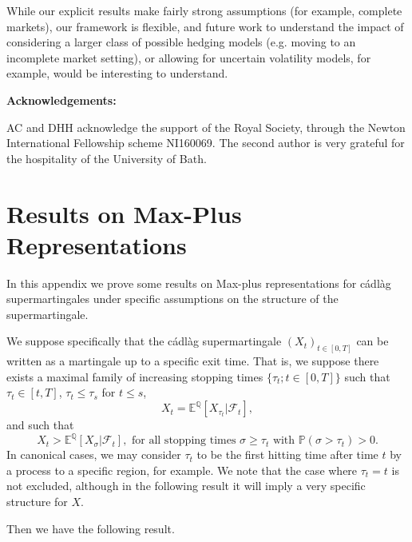 \documentclass[a4paper]{amsart}
\theoremstyle{definition}
\theoremstyle{remark}
\numberwithin{equation}{section}
\newcommand{\E}{\mathbb{E}}
\renewcommand{\P}{\mathbb{P}}
\newcommand{\Q}{\mathbb{Q}}
\newcommand{\Fc}{\mathcal{F}}
\newcommand{\Eq}[1]{\E^{\Q}\left[#1\right]}
\begin{document}
While our explicit results make fairly strong assumptions (for example, complete markets), our framework is flexible, and future work to understand the impact of considering a larger class of possible hedging models (e.g. moving to an incomplete market setting), or allowing for uncertain volatility models, for example, would be interesting to understand.

\bigskip

\filbreak

\noindent
{\bf Acknowledgements:}

\noindent
AC and DHH acknowledge the support of the Royal Society, through the Newton International Fellowship scheme NI160069.  The second author is very grateful for the hospitality of the University of Bath.

\appendix

\section{Results on Max-Plus Representations}

In this appendix we prove some results on Max-plus representations for c\'adl\`ag supermartingales under specific assumptions on the structure of the supermartingale.

We suppose specifically that the c\'adl\`ag supermartingale $(X_t)_{t \in [0,T]}$ can be written as a martingale up to a specific exit time. That is, we suppose there exists a maximal family of increasing stopping times $\{\tau_t; t\in[0,T]\}$ such that $\tau_t \in [t,T]$, $\tau_t \le \tau_s$ for $t \le s$, 
\begin{equation} \label{eq:TauCond}
X_t = \Eq{X_{\tau_t} | \Fc_t},
\end{equation}
and such that 
\begin{equation} \label{eq:TauCond2}
  X_t > \Eq{X_{\sigma} | \Fc_t}, \text{ for all stopping times } \sigma \ge \tau_t \text{ with } \P(\sigma > \tau_t) > 0. 
\end{equation} 
In canonical cases, we may consider $\tau_t$ to be the first hitting time after time $t$ by a process to a specific region, for example. We note that the case where $\tau_t = t$ is not excluded, although in the following result it will imply a very specific structure for $X$.

Then we have the following result.
\end{document}
